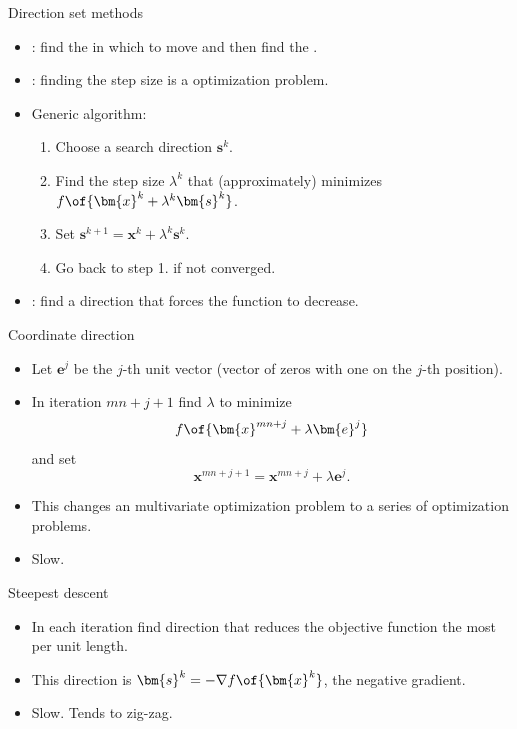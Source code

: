 \documentclass[11pt,xcolor={dvipsnames},aspectratio=159,hyperref={pdftex,pdfpagemode=UseNone,hidelinks,pdfdisplaydoctitle=true},usepdftitle=false]{beamer}
\begin{document}
    \begin{frame}{Direction set methods}
        \begin{itemize}
            \item {}: find the  in which to move and then find the .
            \item {}: finding the step size is a  optimization problem.
            \item Generic algorithm:
                \begin{enumerate}
                    \item Choose a search direction $\bm{s}^k$.
                    \item Find the step size $\lambda^k$ that (approximately) minimizes $f\of{\bm{x}^k + \lambda^k \bm{s}^k}$.
                    \item Set $\bm{s}^{k+1} = \bm{x}^k + \lambda^k \bm{s}^k$.
                    \item Go back to step 1. if not converged.
                \end{enumerate}
            \item {}: find a direction that forces the function to decrease.
            \end{itemize}

    \end{frame}  

    \begin{frame}{Coordinate direction}
        \begin{itemize}
            \item Let $\bm{e}^j$ be the $j$-th unit vector (vector of zeros with one on the $j$-th position).
            \item In iteration $mn+j+1$ find $\lambda$ to minimize $$f\of{\bm{x}^{mn+j} + \lambda \bm{e}^j}$$ and set $$\bm{x}^{mn+j+1} = \bm{x}^{mn+j} + \lambda \bm{e}^j.$$ 
            \item This changes an multivariate optimization problem to a series of  optimization problems.
            \item Slow.
        \end{itemize}

    \end{frame}  

    \begin{frame}{Steepest descent}
        \begin{itemize}
            \item In each iteration find direction that reduces the objective function the most per unit length.
            \item This direction is $\bm{s}^k = - \nabla f\of{\bm{x}^k}$, the negative gradient.
            \item Slow. Tends to zig-zag.
            \end{itemize}

    \end{frame}  
\end{document}
